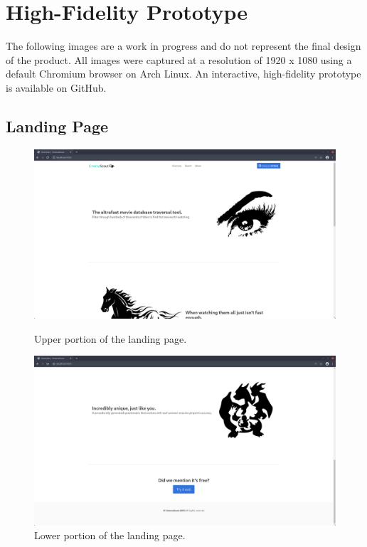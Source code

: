 \documentclass{article}
\begin{document}
\section{High-Fidelity Prototype}
The following images are a work in progress and do not represent the final
design of the product. All images were captured at a resolution of 1920 x
1080 using a default Chromium browser on Arch Linux. An interactive, 
high-fidelity prototype is available on GitHub.
\subsection{Landing Page}

\begin{figure}[p]
\includegraphics[width=\columnwidth]{res/landing_1.png}
\caption{Upper portion of the landing page.}

\includegraphics[width=\columnwidth]{res/landing_2.png}
\caption{Lower portion of the landing page.}
\end{figure}
\end{document}
